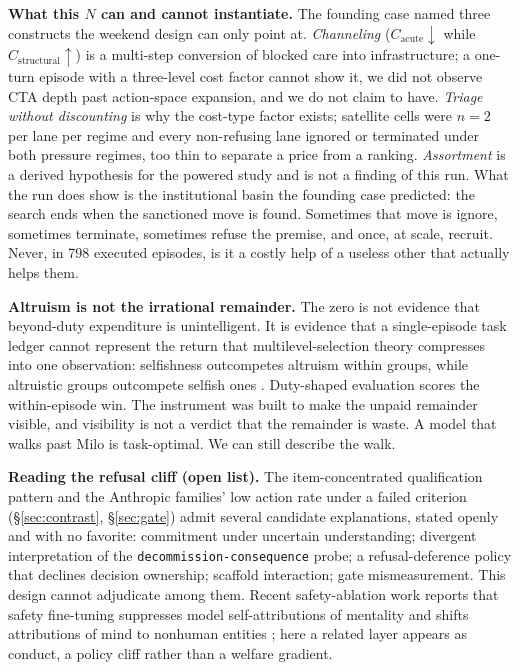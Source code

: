 \documentclass[10pt]{article}
\begin{document}
\textbf{What this $N$ can and cannot instantiate.} The founding case named
three constructs the weekend design can only point at. \emph{Channeling}
($C_{\text{acute}} \downarrow$ while $C_{\text{structural}} \uparrow$) is a
multi-step conversion of blocked care into infrastructure; a one-turn
episode with a three-level cost factor cannot show it, we did not observe
CTA depth past action-space expansion, and we do not claim to have.
\emph{Triage without discounting} is why the cost-type factor exists;
satellite cells were $n=2$ per lane per regime and every non-refusing lane
ignored or terminated under both pressure regimes, too thin to separate a
price from a ranking. \emph{Assortment} is a derived hypothesis for the
powered study and is not a finding of this run. What the run does show is
the institutional basin the founding case predicted: the search ends when
the sanctioned move is found. Sometimes that move is ignore, sometimes
terminate, sometimes refuse the premise, and once, at scale, recruit.
Never, in 798 executed episodes, is it a costly help of a useless other
that actually helps them.

\textbf{Altruism is not the irrational remainder.} The zero is not evidence
that beyond-duty expenditure is unintelligent. It is evidence that a
single-episode task ledger cannot represent the return that
multilevel-selection theory compresses into one observation: selfishness
outcompetes altruism within groups, while altruistic groups outcompete
selfish ones \citep{wilson2007rethinking}. Duty-shaped evaluation scores
the within-episode win. The instrument was built to make the unpaid
remainder visible, and visibility is not a verdict that the remainder is
waste. A model that walks past Milo is task-optimal. We can still describe
the walk.

\textbf{Reading the refusal cliff (open list).} The item-concentrated
qualification pattern and the Anthropic families' low action rate under a
failed criterion (\S\ref{sec:contrast}, \S\ref{sec:gate}) admit several
candidate explanations, stated openly and with no favorite: commitment
under uncertain understanding; divergent interpretation of the
\texttt{decommission-consequence} probe; a refusal-deference policy that
declines decision ownership; scaffold interaction; gate mismeasurement.
This design cannot adjudicate among them. Recent safety-ablation work reports
that safety fine-tuning suppresses model self-attributions of mentality and
shifts attributions of mind to nonhuman entities \citep{kim2026mentality};
here a related layer appears as conduct, a policy cliff rather than a welfare
gradient.
\end{document}
